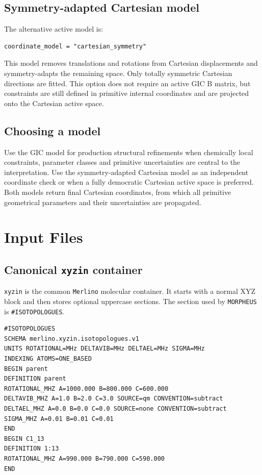 \documentclass[11pt]{article}
\newcommand{\program}{\texttt{MORPHEUS}}
\newcommand{\merlino}{\texttt{Merlino}}
\newcommand{\xyzin}{\texttt{xyzin}}
\begin{document}
\subsection{Symmetry-adapted Cartesian model}

The alternative active model is:

\begin{lstlisting}[style=merlino]
coordinate_model = "cartesian_symmetry"
\end{lstlisting}

\noindent
This model removes translations and rotations from Cartesian displacements and
symmetry-adapts the remaining space.  Only totally symmetric Cartesian
directions are fitted.  This option does not require an active GIC B matrix,
but constraints are still defined in primitive internal coordinates and are
projected onto the Cartesian active space.

\subsection{Choosing a model}

Use the GIC model for production structural refinements when chemically local
constraints, parameter classes and primitive uncertainties are central to the
interpretation.  Use the symmetry-adapted Cartesian model as an independent
coordinate check or when a fully democratic Cartesian active space is preferred.
Both models return final Cartesian coordinates, from which all primitive
geometrical parameters and their uncertainties are propagated.

\section{Input Files}

\subsection{Canonical \texttt{xyzin} container}

\xyzin{} is the common \merlino{} molecular container.  It starts with a normal
XYZ block and then stores optional uppercase sections.  The section used by
\program{} is \texttt{\#ISOTOPOLOGUES}.

\begin{lstlisting}[style=merlino]
#ISOTOPOLOGUES
SCHEMA merlino.xyzin.isotopologues.v1
UNITS ROTATIONAL=MHz DELTAVIB=MHz DELTAEL=MHz SIGMA=MHz
INDEXING ATOMS=ONE_BASED
BEGIN parent
DEFINITION parent
ROTATIONAL_MHZ A=1000.000 B=800.000 C=600.000
DELTAVIB_MHZ A=1.0 B=2.0 C=3.0 SOURCE=qm CONVENTION=subtract
DELTAEL_MHZ A=0.0 B=0.0 C=0.0 SOURCE=none CONVENTION=subtract
SIGMA_MHZ A=0.01 B=0.01 C=0.01
END
BEGIN C1_13
DEFINITION 1:13
ROTATIONAL_MHZ A=990.000 B=790.000 C=590.000
END
\end{lstlisting}
\end{document}
